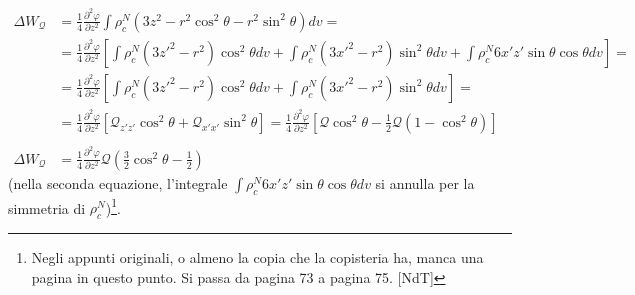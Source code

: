 \begin{equation}
\begin{split}
\Delta W_{\mathcal{Q}} &= \frac{1}{4} \frac{\partial^2 \varphi}{\partial z^2} \int \rho_c^N \left( 3 z^2 - r^2 \cos^2 \theta - r^2 \sin^2 \theta \right) dv =\\
&= \frac{1}{4} \frac{\partial^2 \varphi}{\partial z^2} \left[ \int \rho_c^N \left( 3 z'^2 - r^2 \right) \cos^2 \theta dv + \int \rho_c^N \left( 3 x'^2 - r^2 \right) \sin^2 \theta dv + \int \rho_c^N 6 x'z' \sin \theta \cos \theta dv \right] =\\
&= \frac{1}{4} \frac{\partial^2 \varphi}{\partial z^2} \left[ \int \rho_c^N \left( 3 z'^2 - r^2 \right) \cos^2 \theta dv + \int \rho_c^N \left( 3 x'^2 - r^2 \right) \sin^2 \theta dv \right] =\\
&= \frac{1}{4} \frac{\partial^2 \varphi}{\partial z^2} \left[ \mathcal{Q}_{z' z'} \cos^2 \theta + \mathcal{Q}_{x' x'} \sin^2 \theta \right] = \frac{1}{4} \frac{\partial^2 \varphi}{\partial z^2} \left[ \mathcal{Q} \cos^2 \theta - \frac{1}{2} \mathcal{Q}(1 - \cos^2 \theta) \right]\\
\\
\Delta W_{\mathcal{Q}} &= \frac{1}{4} \frac{\partial^2 \varphi}{\partial z^2} \mathcal{Q} \left( \frac{3}{2} \cos^2 \theta - \frac{1}{2} \right) 
\end{split}
\end{equation}
(nella seconda equazione, l'integrale $\int \rho_c^N 6 x'z' \sin \theta \cos
\theta dv$ si annulla per la simmetria di $\rho_c^N$)\footnote{Negli appunti
  originali, o almeno la copia che la copisteria ha, manca una pagina in questo
punto. Si passa da pagina 73 a pagina 75. [NdT]}.

